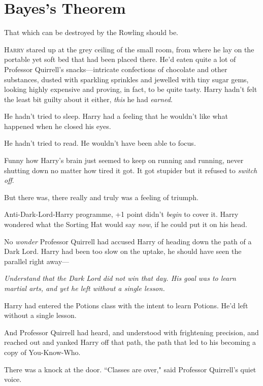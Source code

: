 \chapter{Bayes's Theorem}

\begin{chapterOpeningAuthorNote}
That which can be destroyed by the Rowling should be.
\end{chapterOpeningAuthorNote}

\lettrine{H}{arry} stared up at the grey ceiling of the small room, from where he lay on the portable yet soft bed that had been placed there. He'd eaten quite a lot of Professor Quirrell's snacks—intricate confections of chocolate and other substances, dusted with sparkling sprinkles and jewelled with tiny sugar gems, looking highly expensive and proving, in fact, to be quite tasty. Harry hadn't felt the least bit guilty about it either, \emph{this} he had \emph{earned}.

He hadn't tried to sleep. Harry had a feeling that he wouldn't like what happened when he closed his eyes.

He hadn't tried to read. He wouldn't have been able to focus.

Funny how Harry's brain just seemed to keep on running and running, never shutting down no matter how tired it got. It got stupider but it refused to \emph{switch off}.

But there was, there really and truly was a feeling of triumph.

Anti-Dark-Lord-Harry programme, +1 point didn't \emph{begin} to cover it. Harry wondered what the Sorting Hat would say \emph{now}, if he could put it on his head.

No \emph{wonder} Professor Quirrell had accused Harry of heading down the path of a Dark Lord. Harry had been too slow on the uptake, he should have seen the parallel right away—

\emph{Understand that the Dark Lord did not win that day. His goal was to learn martial arts, and yet he left without a single lesson.}

Harry had entered the Potions class with the intent to learn Potions. He'd left without a single lesson.

And Professor Quirrell had heard, and understood with frightening precision, and reached out and yanked Harry off that path, the path that led to his becoming a copy of You-Know-Who.

There was a knock at the door. ``Classes are over," said Professor Quirrell's quiet voice.

